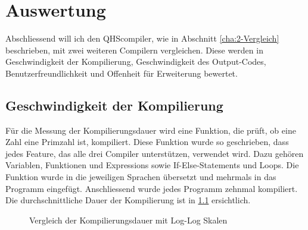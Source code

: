 \chapter{Auswertung}
Abschliessend will ich den QHScompiler, wie in Abschnitt \ref{cha:2-Vergleich} beschrieben, mit zwei weiteren Compilern vergleichen.
Diese werden in Geschwindigkeit der Kompilierung, Geschwindigkeit des Output-Codes, Benutzerfreundlichkeit und Offenheit für Erweiterung bewertet. 

\section{Geschwindigkeit der Kompilierung} \label{sec:compare-compilespeed}
Für die Messung der Kompilierungsdauer wird eine Funktion, die prüft, ob eine Zahl eine Primzahl ist, kompiliert. Diese Funktion wurde so geschrieben, dass jedes Feature, das alle drei Compiler unterstützen, verwendet wird.
Dazu gehören Variablen, Funktionen und Expressions sowie If-Else-Statements und Loops. Die Funktion wurde in die jeweiligen Sprachen übersetzt und mehrmals in das Programm eingefügt. Anschliessend wurde jedes Programm zehnmal kompiliert.
Die durchschnittliche Dauer der Kompilierung ist in \ref{fig:compilespeed} ersichtlich.

\begin{figure}[h!]
\centering
\label{fig:compilespeed}
\caption{Vergleich der Kompilierungsdauer mit Log-Log Skalen}
\end{figure}

